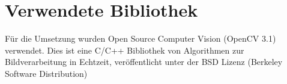 \section{Verwendete Bibliothek}
Für die Umsetzung wurden Open Source Computer Vision (OpenCV 3.1) verwendet. Dies ist eine C/C++ Bibliothek von Algorithmen zur Bildverarbeitung in Echtzeit, veröffentlicht unter der BSD Lizenz (Berkeley
Software Distribution)\\
\cite{OpenCv_What_Is}\cite{wiki_Wha_is_OPenCV}